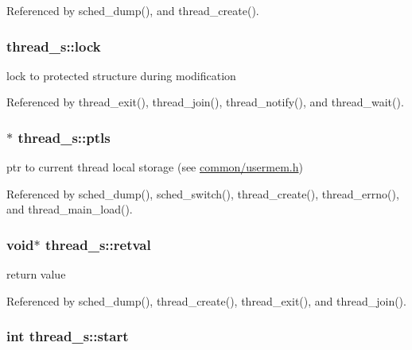Referenced by sched\-\_\-dump(), and thread\-\_\-create().

\hypertarget{structthread__s_a483959ed6abed6c12f49643c4495a7b1}{
\subsubsection[{lock}]{ thread\-\_\-s\-::lock}}\label{structthread__s_a483959ed6abed6c12f49643c4495a7b1}


lock to protected structure during modification 



Referenced by thread\-\_\-exit(), thread\-\_\-join(), thread\-\_\-notify(), and thread\-\_\-wait().

\hypertarget{structthread__s_a7ad218d5b7c4b6bc9c4602e6b1a89815}{
\subsubsection[{ptls}]{$\ast$ thread\-\_\-s\-::ptls}}\label{structthread__s_a7ad218d5b7c4b6bc9c4602e6b1a89815}


ptr to current thread local storage (see \hyperlink{usermem_8h}{common/usermem.\-h}) 



Referenced by sched\-\_\-dump(), sched\-\_\-switch(), thread\-\_\-create(), thread\-\_\-errno(), and thread\-\_\-main\-\_\-load().

\hypertarget{structthread__s_aeefa131a48c8c3c45e6c3c0819f21cd0}{
\subsubsection[{retval}]{\setlength{\rightskip}{0pt plus 5cm}void$\ast$ thread\-\_\-s\-::retval}}\label{structthread__s_aeefa131a48c8c3c45e6c3c0819f21cd0}


return value 



Referenced by sched\-\_\-dump(), thread\-\_\-create(), thread\-\_\-exit(), and thread\-\_\-join().

\hypertarget{structthread__s_a63551d8e6d21a7370c5b3652cea282fc}{
\subsubsection[{start}]{\setlength{\rightskip}{0pt plus 5cm}int thread\-\_\-s\-::start}}\label{structthread__s_a63551d8e6d21a7370c5b3652cea282fc}


